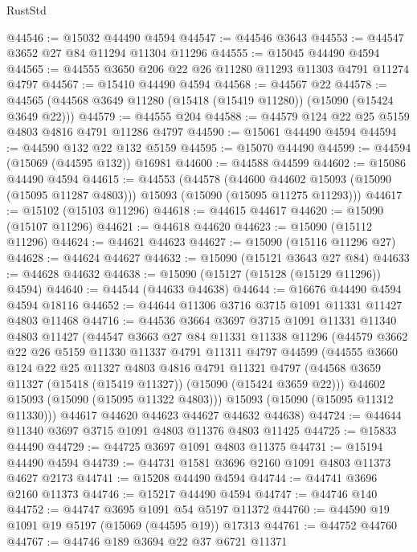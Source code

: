 \begin{lexlean}{RustStd}
\begin{coremodule}
@44546 := @15032 @44490 @4594
@44547 := @44546 @3643
@44553 := @44547 @3652 @27 @84 @11294 @11304 @11296
@44555 := @15045 @44490 @4594
@44565 := @44555 @3650 @206 @22 @26 @11280 @11293 @11303 @4791 @11274 @4797
@44567 := @15410 @44490 @4594
@44568 := @44567 @22
@44578 := @44565 (@44568 @3649 @11280 (@15418 (@15419 @11280)) (@15090 (@15424 @3649 @22)))
@44579 := @44555 @204
@44588 := @44579 @124 @22 @25 @5159 @4803 @4816 @4791 @11286 @4797
@44590 := @15061 @44490 @4594
@44594 := @44590 @132 @22 @132 @5159
@44595 := @15070 @44490
@44599 := @44594 (@15069 (@44595 @132)) @16981
@44600 := @44588 @44599
@44602 := @15086 @44490 @4594
@44615 := @44553
    (@44578
      (@44600 @44602 @15093 (@15090 (@15095 @11287 @4803)))
      @15093
      (@15090 (@15095 @11275 @11293)))
@44617 := @15102 (@15103 @11296)
@44618 := @44615 @44617
@44620 := @15090 (@15107 @11296)
@44621 := @44618 @44620
@44623 := @15090 (@15112 @11296)
@44624 := @44621 @44623
@44627 := @15090 (@15116 @11296 @27)
@44628 := @44624 @44627
@44632 := @15090 (@15121 @3643 @27 @84)
@44633 := @44628 @44632
@44638 := @15090 (@15127 (@15128 (@15129 @11296)) @4594)
@44640 := @44544 (@44633 @44638)
@44644 := @16676 @44490 @4594 @4594 @18116
@44652 := @44644 @11306 @3716 @3715 @1091 @11331 @11427 @4803 @11468
@44716 := @44536
    @3664
    @3697
    @3715
    @1091
    @11331
    @11340
    @4803
    @11427
    (@44547
      @3663
      @27
      @84
      @11331
      @11338
      @11296
      (@44579
        @3662
        @22
        @26
        @5159
        @11330
        @11337
        @4791
        @11311
        @4797
        @44599
        (@44555
          @3660
          @124
          @22
          @25
          @11327
          @4803
          @4816
          @4791
          @11321
          @4797
          (@44568 @3659 @11327 (@15418 (@15419 @11327)) (@15090 (@15424 @3659 @22)))
          @44602
          @15093
          (@15090 (@15095 @11322 @4803)))
        @15093
        (@15090 (@15095 @11312 @11330)))
      @44617
      @44620
      @44623
      @44627
      @44632
      @44638)
@44724 := @44644 @11340 @3697 @3715 @1091 @4803 @11376 @4803 @11425
@44725 := @15833 @44490
@44729 := @44725 @3697 @1091 @4803 @11375
@44731 := @15194 @44490 @4594
@44739 := @44731 @1581 @3696 @2160 @1091 @4803 @11373 @4627 @2173
@44741 := @15208 @44490 @4594
@44744 := @44741 @3696 @2160 @11373
@44746 := @15217 @44490 @4594
@44747 := @44746 @140
@44752 := @44747 @3695 @1091 @54 @5197 @11372
@44760 := @44590 @19 @1091 @19 @5197 (@15069 (@44595 @19)) @17313
@44761 := @44752 @44760
@44767 := @44746 @189 @3694 @22 @37 @6721 @11371

\end{coremodule}
\end{lexlean}
